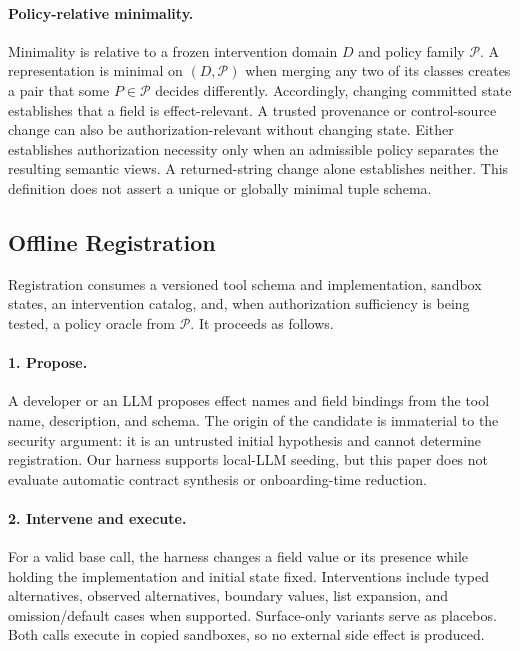 \documentclass[letterpaper,twocolumn,10pt]{article}
\theoremstyle{definition}
\begin{document}
\paragraph{Policy-relative minimality.}
Minimality is relative to a frozen intervention domain $D$ and policy family
$\mathcal P$.  A representation is minimal on $(D,\mathcal P)$ when merging
any two of its classes creates a pair that some $P\in\mathcal P$ decides
differently.  Accordingly, changing committed state establishes that a field
is effect-relevant.  A trusted provenance or control-source change can also be
authorization-relevant without changing state.  Either establishes
authorization necessity only when an admissible policy separates the resulting
semantic views.  A returned-string change alone establishes neither.  This
definition does not assert a unique or globally minimal tuple schema.

\subsection{Offline Registration}

Registration consumes a versioned tool schema and implementation, sandbox
states, an intervention catalog, and, when authorization sufficiency is being
tested, a policy oracle from $\mathcal P$.  It proceeds as follows.

\paragraph{1. Propose.}
A developer or an LLM proposes effect names and field bindings from the tool
name, description, and schema.  The origin of the candidate is immaterial to
the security argument: it is an untrusted initial hypothesis and cannot
determine registration.  Our harness supports local-LLM seeding, but this paper
does not evaluate automatic contract synthesis or onboarding-time reduction.

\paragraph{2. Intervene and execute.}
For a valid base call, the harness changes a field value or its presence while
holding the implementation and initial state fixed.  Interventions include
typed alternatives, observed alternatives, boundary values, list expansion,
and omission/default cases when supported.  Surface-only variants serve as
placebos.  Both calls execute in copied sandboxes, so no external side effect
is produced.
\end{document}

